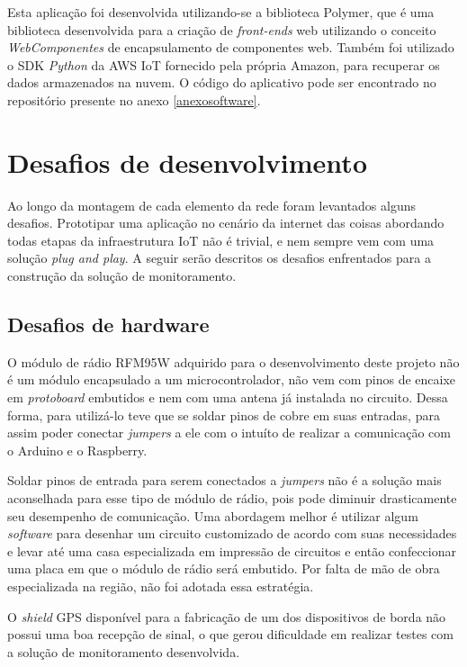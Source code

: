 \documentclass[
    hidelinks,
	12pt,				%
	openany,
	oneside, 
	a4paper,			%
	english,			%
	french,				%
	spanish,			%
	brazil				%
	]{abntex2}
\begin{document}
Esta aplicação foi desenvolvida utilizando-se a biblioteca Polymer, que é uma biblioteca desenvolvida para a criação de \textit{front-ends} web utilizando o conceito \textit{WebComponentes} de encapsulamento de componentes web. Também foi utilizado o SDK \textit{Python} da AWS IoT fornecido pela própria Amazon, para recuperar os dados armazenados na nuvem. O código do aplicativo pode ser encontrado no repositório presente no anexo \ref{anexosoftware}.

\section{Desafios de desenvolvimento}

Ao longo da montagem de cada elemento da rede foram levantados alguns desafios. Prototipar uma aplicação no cenário da internet das coisas abordando todas etapas da infraestrutura IoT não é trivial, e nem sempre vem com uma solução \textit{plug and play}. A seguir serão descritos os desafios enfrentados para a construção da solução de monitoramento.

\subsection{Desafios de hardware}

O módulo de rádio RFM95W adquirido para o desenvolvimento deste projeto não é um módulo encapsulado a um microcontrolador, não vem com pinos de encaixe em \textit{protoboard} embutidos e nem com uma antena já instalada no circuito. Dessa forma, para utilizá-lo teve que se soldar pinos de cobre em suas entradas, para assim poder conectar \textit{jumpers} a ele com o intuíto de realizar a comunicação com o Arduino e o Raspberry. 

Soldar pinos de entrada para serem conectados a \textit{jumpers} não é a solução mais aconselhada para esse tipo de módulo de rádio, pois pode diminuir drasticamente seu desempenho de comunicação. Uma abordagem melhor é utilizar algum \textit{software} para desenhar um circuito customizado de acordo com suas necessidades e levar até uma casa especializada em impressão de circuitos e então confeccionar uma placa em que o módulo de rádio será embutido. Por falta de mão de obra especializada na região, não foi adotada essa estratégia.

O \textit{shield} GPS disponível para a fabricação de um dos dispositivos de borda não possui uma boa recepção de sinal, o que gerou dificuldade em realizar testes com a solução de monitoramento desenvolvida.
\end{document}
